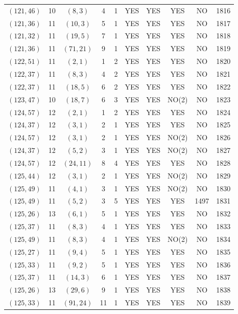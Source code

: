 \begin{longtable}{|c|c|c|c|c|c|c|c|c|c|}
$(121, 46)$ & 10 & $(8, 3)$ & 4 & 1 & YES & YES & YES & NO & 1816\\
$(121, 36)$ & 11 & $(10, 3)$ & 5 & 1 & YES & YES & YES & NO & 1817\\
$(121, 32)$ & 11 & $(19, 5)$ & 7 & 1 & YES & YES & YES & NO & 1818\\
$(121, 36)$ & 11 & $(71, 21)$ & 9 & 1 & YES & YES & YES & NO & 1819\\
$(122, 51)$ & 11 & $(2, 1)$ & 1 & 2 & YES & YES & YES & NO & 1820\\
$(122, 37)$ & 11 & $(8, 3)$ & 4 & 2 & YES & YES & YES & NO & 1821\\
$(122, 37)$ & 11 & $(18, 5)$ & 6 & 2 & YES & YES & YES & NO & 1822\\
$(123, 47)$ & 10 & $(18, 7)$ & 6 & 3 & YES & YES & NO(2) & NO & 1823\\
$(124, 57)$ & 12 & $(2, 1)$ & 1 & 2 & YES & YES & YES & NO & 1824\\
$(124, 37)$ & 12 & $(3, 1)$ & 2 & 1 & YES & YES & YES & NO & 1825\\
$(124, 57)$ & 12 & $(3, 1)$ & 2 & 1 & YES & YES & NO(2) & NO & 1826\\
$(124, 37)$ & 12 & $(5, 2)$ & 3 & 1 & YES & YES & NO(2) & NO & 1827\\
$(124, 57)$ & 12 & $(24, 11)$ & 8 & 4 & YES & YES & YES & NO & 1828\\
$(125, 44)$ & 12 & $(3, 1)$ & 2 & 1 & YES & YES & NO(2) & NO & 1829\\
$(125, 49)$ & 11 & $(4, 1)$ & 3 & 1 & YES & YES & NO(2) & NO & 1830\\
$(125, 49)$ & 11 & $(5, 2)$ & 3 & 5 & YES & YES & YES & 1497 & 1831\\
$(125, 26)$ & 13 & $(6, 1)$ & 5 & 1 & YES & YES & YES & NO & 1832\\
$(125, 37)$ & 11 & $(8, 3)$ & 4 & 1 & YES & YES & YES & NO & 1833\\
$(125, 49)$ & 11 & $(8, 3)$ & 4 & 1 & YES & YES & NO(2) & NO & 1834\\
$(125, 27)$ & 11 & $(9, 4)$ & 5 & 1 & YES & YES & YES & NO & 1835\\
$(125, 33)$ & 11 & $(9, 2)$ & 5 & 1 & YES & YES & YES & NO & 1836\\
$(125, 37)$ & 11 & $(14, 3)$ & 6 & 1 & YES & YES & YES & NO & 1837\\
$(125, 26)$ & 13 & $(29, 6)$ & 9 & 1 & YES & YES & YES & NO & 1838\\
$(125, 33)$ & 11 & $(91, 24)$ & 11 & 1 & YES & YES & YES & NO & 1839\\

\end{longtable}
